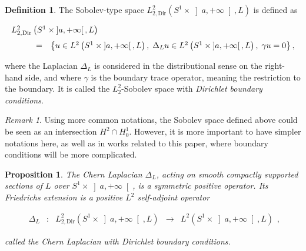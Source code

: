 \documentclass{jams-l}
\newtheorem{proposition}[theorem]{Proposition}
\theoremstyle{definition}
\newtheorem{definition}[theorem]{Definition}
\theoremstyle{remark}
\newtheorem{remark}[theorem]{Remark}
\numberwithin{equation}{section}
\begin{document}
        \begin{definition}
        
            The Sobolev-type space $L^2_{2, \text{Dir}} \left( S^1 \times \left] a, +\infty \right[, L \right)$ is defined as
            
            \[ \begin{array}{lll}
                    \multicolumn{3}{l}{L^2_{2, \text{Dir}} \left( S^1 \times \left] a, +\infty \right[, L \right)} \\[0.7em]
                    
                    \qquad & = & \left \{ u \in L^2 \left( S^1 \times \left] a, +\infty \right[, L \right), \; \Delta_L u \in L^2 \left( S^1 \times \left] a, +\infty \right[, L \right), \; \gamma u = 0 \right \},
                \end{array} \]
            
            \noindent where the Laplacian $\Delta_L$ is considered in the distributional sense on the right-hand side, and where $\gamma$ is the boundary trace operator, meaning the restriction to the boundary. It is called the $L^2_2$-Sobolev space with \textit{Dirichlet boundary conditions}.
        
        \end{definition}
        
        \begin{remark}
        
            Using more common notations, the Sobolev space defined above could be seen as an intersection $H^2 \cap H^1_0$. However, it is more important to have simpler notations here, as well as in works related to this paper, where boundary conditions will be more complicated.
        
        \end{remark}
        
        \begin{proposition}
        
            The Chern Laplacian $\Delta_L$, acting on smooth compactly supported sections of $L$ over $S^1 \times \left] a, +\infty \right[$, is a symmetric positive operator. Its Friedrichs extension is a positive $L^2$ self-adjoint operator
            
            \[ \begin{array}{lllll}
                    \Delta_L & : & L^2_{2, \mathrm{Dir}} \left( S^1 \times \left] a, +\infty \right[, L \right) & \longrightarrow & L^2 \left( S^1 \times \left] a, +\infty \right[, L \right)
                \end{array} , \]
            
            \noindent called the Chern Laplacian with Dirichlet boundary conditions.
        
        \end{proposition}
        
\end{document}
